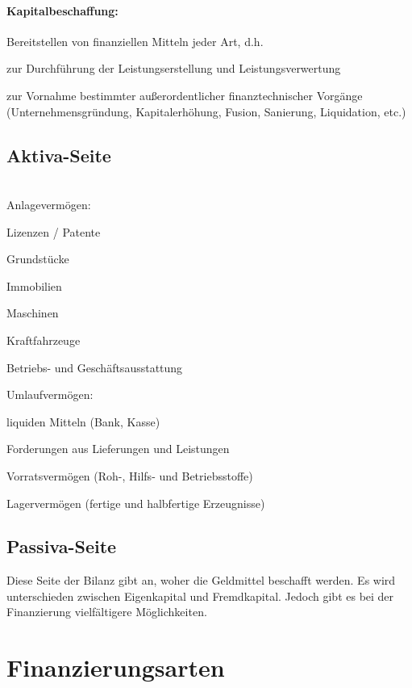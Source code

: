 \paragraph{Kapitalbeschaffung:} Bereitstellen von finanziellen Mitteln jeder Art, d.h.
\begin{compactitem}
	\item zur Durchführung der Leistungserstellung und Leistungsverwertung
	\item zur Vornahme bestimmter außerordentlicher finanztechnischer Vorgänge (Unternehmensgründung, Kapitalerhöhung, Fusion, Sanierung, Liquidation, etc.)
\end{compactitem}

\subsection{Aktiva-Seite}\quad\\
Anlagevermögen:
\begin{compactitem}
	\item Lizenzen / Patente
	\item Grundstücke
	\item Immobilien
	\item Maschinen
	\item Kraftfahrzeuge
	\item Betriebs- und Geschäftsausstattung
\end{compactitem}

Umlaufvermögen:
\begin{compactitem}
	\item liquiden Mitteln (Bank, Kasse)
	\item Forderungen aus Lieferungen und Leistungen
	\item Vorratsvermögen (Roh-, Hilfs- und Betriebsstoffe)
	\item Lagervermögen (fertige und halbfertige Erzeugnisse)
\end{compactitem}

\subsection{Passiva-Seite}
Diese Seite der Bilanz gibt an, woher die Geldmittel beschafft werden. Es wird unterschieden zwischen Eigenkapital und Fremdkapital. Jedoch gibt es bei der Finanzierung vielfältigere Möglichkeiten.

\clearpage
\section{Finanzierungsarten}
